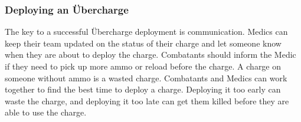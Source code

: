 \subsubsection{Deploying an Übercharge}
The key to a successful Übercharge deployment is communication.  Medics can keep their team updated on the status of their charge and let someone know when they are about to deploy the charge.  Combatants should inform the Medic if they need to pick up more ammo or reload before the charge.  A charge on someone without ammo is a wasted charge.  Combatants and Medics can work together to find the best time to deploy a charge.  Deploying it too early can waste the charge, and deploying it too late can get them killed before they are able to use the charge. 